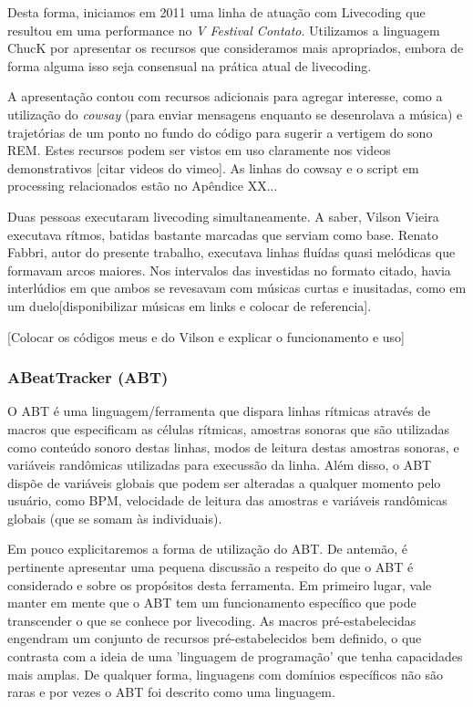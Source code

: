 Desta forma, iniciamos em 2011 uma linha de atuação com Livecoding que resultou em uma performance
no \emph{V Festival Contato}. Utilizamos a linguagem ChucK por apresentar os recursos que
consideramos mais apropriados, embora de forma alguma isso seja consensual na prática atual
de livecoding.

A apresentação contou com recursos adicionais para agregar interesse, como a utilização
do \emph{cowsay} (para enviar mensagens enquanto se desenrolava a música) e trajetórias
de um ponto no fundo do código para sugerir a vertigem do sono REM. Estes recursos
podem ser vistos em uso claramente nos videos demonstrativos [citar videos do vimeo].
As linhas do cowsay e o script em processing relacionados estão no Apêndice XX...

Duas pessoas executaram livecoding simultaneamente. A saber, Vilson Vieira executava
rítmos, batidas bastante marcadas que serviam como base. Renato Fabbri, autor do presente
trabalho, executava linhas fluídas quasi melódicas que formavam arcos maiores. Nos intervalos
das investidas no formato citado, havia interlúdios em que ambos se revesavam com músicas
curtas e inusitadas, como em um duelo[disponibilizar músicas em links e colocar de referencia].

[Colocar os códigos meus e do Vilson e explicar o funcionamento e uso]





      \subsubsection{ABeatTracker (ABT)}
O ABT é uma linguagem/ferramenta que dispara linhas rítmicas através de macros que especificam
as células rítmicas, amostras sonoras que são utilizadas como conteúdo sonoro destas
linhas, modos de leitura destas amostras sonoras, e variáveis randômicas utilizadas
para execussão da linha. Além disso, o ABT dispõe de variáveis globais que podem ser alteradas
a qualquer momento pelo usuário, como BPM, velocidade de leitura das amostras e variáveis
randômicas globais (que se somam às individuais).

Em pouco explicitaremos a forma de utilização do ABT. De antemão, é pertinente apresentar
uma pequena discussão a respeito do que o ABT é considerado e sobre os propósitos desta
ferramenta. Em primeiro lugar, vale manter em mente que o ABT tem um funcionamento específico
que pode transcender o que se conhece por livecoding. As macros pré-estabelecidas engendram um
conjunto de recursos pré-estabelecidos bem definido, o que contrasta com a ideia de uma 'linguagem
de programação' que tenha capacidades mais amplas. De qualquer forma, linguagens com domínios
específicos não são raras e por vezes o ABT foi descrito como uma linguagem.

